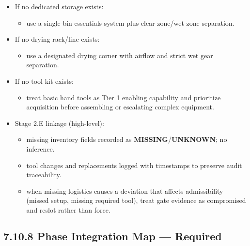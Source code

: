\documentclass[10pt]{article}
\begin{document}
\begin{itemize}
\item If no dedicated storage exists:
  \begin{itemize}
  \item use a single-bin essentials system plus clear zone/wet zone separation.
  \end{itemize}
\item If no drying rack/line exists:
  \begin{itemize}
  \item use a designated drying corner with airflow and strict wet gear separation.
  \end{itemize}
\item If no tool kit exists:
  \begin{itemize}
  \item treat basic hand tools as Tier 1 enabling capability and prioritize acquisition before assembling or escalating complex equipment.
  \end{itemize}
\item Stage 2.E linkage (high-level):
  \begin{itemize}
  \item missing inventory fields recorded as \textbf{MISSING}/\textbf{UNKNOWN}; no inference.
  \item tool changes and replacements logged with timestamps to preserve audit traceability.
  \item when missing logistics causes a deviation that affects admissibility (missed setup, missing required tool), treat gate evidence as compromised and reslot rather than force.
  \end{itemize}
\end{itemize}

\subsection*{7.10.8 Phase Integration Map — Required}
{}

\begingroup
\scriptsize
\setlength{\tabcolsep}{2pt}
\renewcommand{\arraystretch}{1.10}
\end{document}
